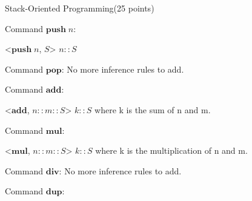 \documentclass{article}
\begin{document}
\newpage
\begin{question}{Stack-Oriented Programming}{(25 points)}

\newcommand{\push}[1]{\ensuremath{\mathbf{push}\;#1}}
\newcommand{\add}{\ensuremath{\mathbf{add}}}
\newcommand{\mul}{\ensuremath{\mathbf{mul}}}
\newcommand{\divcom}{\ensuremath{\mathbf{div}}}
\newcommand{\pop}{\ensuremath{\mathbf{pop}}}
\newcommand{\dup}{\ensuremath{\mathbf{dup}}}
\newcommand{\swap}[1]{\ensuremath{\mathbf{swap}\;{#1}}}
\newcommand{\seq}[2]{\ensuremath{#1; #2}}
\renewcommand{\skip}{\ensuremath{\mathbf{skip}}}
\newcommand{\WHILENE}{\ensuremath{\mathbf{whilene}}\xspace}
\newcommand{\whilene}[1]{\ensuremath{\WHILENE\;\{#1\}}}
\newcommand{\emptystack}{\ensuremath{[]}}
\newcommand{\stack}{\ensuremath{S}}
\newcommand{\cons}[2]{\ensuremath{#1 :: #2}}




  \begin{subquestion}
    \begin{subsubquestion}
      Command $\push{n}$: 
      
      \infrule[PUSH]
      {
      	
      }
      {
      	<$\push n$, $\stack$> \stepsto $\cons{n}{S}$
      }
      {
      }
    \end{subsubquestion}
    \begin{subsubquestion}
      Command $\pop$: No more inference rules to add.
    \end{subsubquestion}
    \begin{subsubquestion}
      Command $\add$:
      
      \infrule[ADD]
      {
      	
      }
      {
      	<$\add$, $\cons{\cons{n}{m}}{S}$> \stepsto $\cons{k}{S}$
      }
      {
      	where k is the sum of n and m.
      }
    \end{subsubquestion}
    \begin{subsubquestion}
      Command $\mul$: 
      
      \infrule[MUL]
      {
      	
      }
      {
      	<$\mul$, $\cons{\cons{n}{m}}{S}$> \stepsto $\cons{k}{S}$
      }
      {
      	where k is the multiplication of n and m.
      }
    \end{subsubquestion}
    \begin{subsubquestion}
      Command $\divcom$: No more inference rules to add.
    \end{subsubquestion}
    \begin{subsubquestion}
      Command $\dup$: 
      

\end{subsubquestion}
\end{subquestion}
\end{question}
\end{document}
